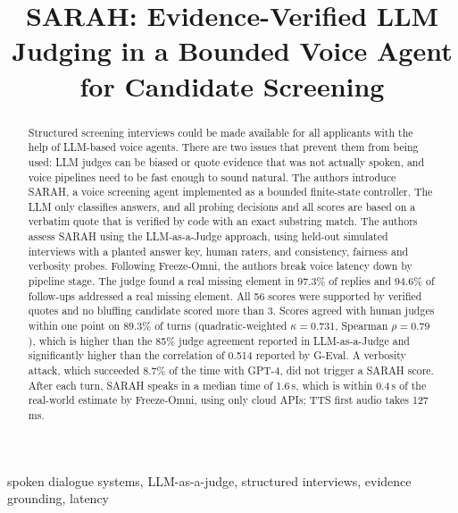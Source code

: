 \documentclass[conference]{IEEEtran}
\begin{document}
\title{SARAH: Evidence-Verified LLM Judging in a Bounded Voice Agent for Candidate Screening}

\author{
}

\maketitle

\begin{abstract}
Structured screening interviews could be made available for all applicants with the help of LLM-based voice agents. There are two issues that prevent them from being used: LLM judges can be biased or quote evidence that was not actually spoken, and voice pipelines need to be fast enough to sound natural. The authors introduce SARAH, a voice screening agent implemented as a bounded finite-state controller. The LLM only classifies answers, and all probing decisions and all scores are based on a verbatim quote that is verified by code with an exact substring match. The authors assess SARAH using the LLM-as-a-Judge approach, using held-out simulated interviews with a planted answer key, human raters, and consistency, fairness and verbosity probes. Following Freeze-Omni, the authors break voice latency down by pipeline stage. The judge found a real missing element in 97.3\% of replies and 94.6\% of follow-ups addressed a real missing element. All 56 scores were supported by verified quotes and no bluffing candidate scored more than 3. Scores agreed with human judges within one point on 89.3\% of turns (quadratic-weighted $\kappa = 0.731$, Spearman $\rho = 0.79$), which is higher than the 85\% judge agreement reported in LLM-as-a-Judge and significantly higher than the correlation of 0.514 reported by G-Eval. A verbosity attack, which succeeded 8.7\% of the time with GPT-4, did not trigger a SARAH score. After each turn, SARAH speaks in a median time of 1.6\,s, which is within 0.4\,s of the real-world estimate by Freeze-Omni, using only cloud APIs; TTS first audio takes 127\,ms.
\end{abstract}

\begin{IEEEkeywords}
spoken dialogue systems, LLM-as-a-judge, structured interviews, evidence grounding, latency
\end{IEEEkeywords}
\end{document}
